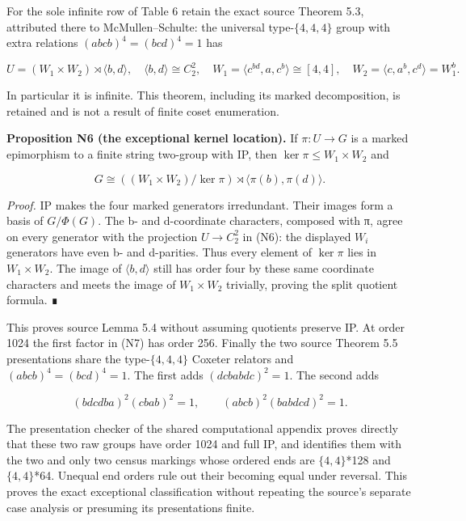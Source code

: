 For the sole infinite row of Table 6 retain the exact source Theorem 5.3, attributed there to McMullen--Schulte: the universal type-\(\{4,4,4\}\) group with extra relations \((abcb)^{4}=(bcd)^{4}=1\) has

\[
U=(W_1\times W_2)\rtimes\langle b,d\rangle,
\quad \langle b,d\rangle\cong C_2^2,\quad
W_1=\langle c^{bd},a,c^b\rangle\cong[4,4],\quad
W_2=\langle c,a^b,c^d\rangle=W_1^b.
\tag{N6}
\]

In particular it is infinite. This theorem, including its marked decomposition, is retained and is not a result of finite coset enumeration.

\textbf{Proposition N6 (the exceptional kernel location).} If \(\pi :U\to G\) is a marked epimorphism to a finite string two-group with IP, then \(\ker\pi\le W_{1}\times W_{2}\) and

\[
G\cong ((W_1\times W_2)/\ker\pi)\rtimes\langle\pi(b),\pi(d)\rangle.
\tag{N7}
\]

\emph{Proof.} IP makes the four marked generators irredundant. Their images form a basis of \(G/\Phi(G)\). The b- and d-coordinate characters, composed with π, agree on every generator with the projection \(U\to C_{2}^{2}\) in (N6): the displayed \(W_{i}\) generators have even b- and d-parities. Thus every element of \(\ker\pi\) lies in \(W_{1}\times W_{2}\). The image of \(\langle b,d\rangle\) still has order four by these same coordinate characters and meets the image of \(W_{1}\times W_{2}\) trivially, proving the split quotient formula. ∎

This proves source Lemma 5.4 without assuming quotients preserve IP. At order 1024 the first factor in (N7) has order 256. Finally the two source Theorem 5.5 presentations share the type-\(\{4,4,4\}\) Coxeter relators and \((abcb)^{4}=(bcd)^{4}=1\). The first adds \((dcbabdc)^{2}=1\). The second adds

\[
(bdcdba)^2(cbab)^2=1,\qquad(abcb)^2(babdcd)^2=1.
\tag{N8}
\]

The presentation checker of the shared computational appendix proves directly that these two raw groups have order 1024 and full IP, and identifies them with the two and only two census markings whose ordered ends are \(\{4,4\}\)*128 and \(\{4,4\}\)*64. Unequal end orders rule out their becoming equal under reversal. This proves the exact exceptional classification without repeating the source's separate case analysis or presuming its presentations finite.

